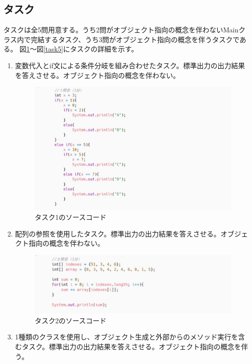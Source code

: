\documentclass[paper=a4paper,fontsize=11pt]{jlreq}
\begin{document}
  \subsection{タスク}
    タスクは全5問用意する。うち2問がオブジェクト指向の概念を伴わないMainクラス内で完結するタスク、うち3問がオブジェクト指向の概念を伴うタスクである。
    図\ref{task1}～図\ref{task5}にタスクの詳細を示す。\\
    \begin{enumerate}[label=タスク\arabic*:]
      \item 変数代入とif文による条件分岐を組み合わせたタスク。標準出力の出力結果を答えさせる。オブジェクト指向の概念を伴わない。
      \begin{figure}[h]
        \centering
        \includegraphics[height=0.5\linewidth]{プログラム画像_タスク1.jpg}
        \caption{タスク1のソースコード}
        \label{task1}
      \end{figure}
      \FloatBarrier
      \item 配列の参照を使用したタスク。標準出力の出力結果を答えさせる。オブジェクト指向の概念を伴わない。
      \begin{figure}[h]
        \centering
        \includegraphics[height=0.25\linewidth]{プログラム画像_タスク2.jpg}
        \caption{タスク2のソースコード}
        \label{task2}
      \end{figure}
      \FloatBarrier
      \item 1種類のクラスを使用し、オブジェクト生成と外部からのメソッド実行を含むタスク。標準出力の出力結果を答えさせる。オブジェクト指向の概念を伴う。

\end{enumerate}
\end{document}
